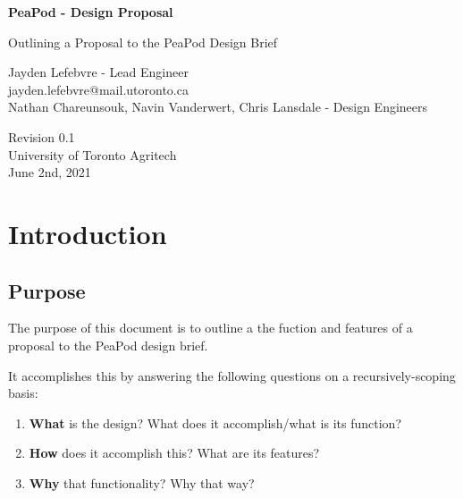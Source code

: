 \documentclass{report}
\begin{document}
\begin{titlepage}
    \begin{center}
        \vspace*{1.2cm}

        \textbf{\large{PeaPod - Design Proposal}}

        \vspace{0.5cm}

        Outlining a Proposal to the PeaPod Design Brief

        \vfill

        Jayden Lefebvre - Lead Engineer\\\small{jayden.lefebvre@mail.utoronto.ca}\\
        \vspace{1cm}
        Nathan Chareunsouk, Navin Vanderwert, Chris Lansdale - Design Engineers

        \vspace{2.5cm}

        Revision 0.1\\
        University of Toronto Agritech\\
        June 2nd, 2021

    \end{center}
\end{titlepage}

\thispagestyle{plain}

\tableofcontents
\newpage

\section{Introduction}
\label{sec:intro}

\subsection{Purpose}
\label{sec:purpose}

The purpose of this document is to outline a the fuction and features of a proposal to the PeaPod design brief.

It accomplishes this by answering the following questions on a recursively-scoping basis:
\begin{enumerate}
    \item \textbf{What} is the design? What does it accomplish/what is its function? 
    \item \textbf{How} does it accomplish this? What are its features? 
    \item \textbf{Why} that functionality? Why that way?
\end{enumerate}
\end{document}
